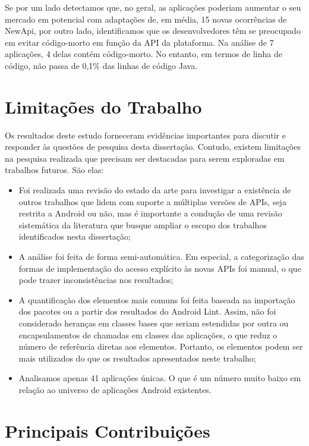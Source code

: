 Se por um lado detectamos que, no geral, as aplicações poderiam aumentar o seu mercado
em potencial com adaptações de, em média, 15 novas ocorrências de NewApi,  por outro
lado, identificamos que os desenvolvedores têm se preocupado em evitar código-morto
em função da API da plataforma. Na análise de 7 aplicações, 4 delas contém código-morto.
No entanto, em termos de linha de código, não passa de 0,1\% das linhas de código Java.

\section{Limitações do Trabalho}\label{sec:limitacoes}

Os resultados deste estudo forneceram evidências importantes para discutir e responder
às questões de pesquisa desta dissertação. Contudo, existem limitações na pesquisa
realizada que precisam ser destacadas para serem exploradas em trabalhos futuros.
São elas:

\begin{itemize}
	\item Foi realizada uma revisão do estado da arte para investigar a existência de
		outros trabalhos que lidem com suporte a múltiplas versões de APIs, seja restrita
		a Android ou não, mas é importante a condução de uma revisão sistemática da
		literatura que busque ampliar o escopo dos trabalhos identificados nesta dissertação;
	\item A análise foi feita de forma semi-automática. Em especial, a categorização
		das formas de implementação do acesso explícito às novas APIs foi manual, o que
		pode trazer inconsistências nos resultados;
	\item A quantificação dos elementos mais comuns foi feita baseada na importação dos
		pacotes ou a partir dos resultados do Android Lint. Assim, não foi considerado
		heranças em classes bases que seriam estendidas por outra ou encapsulamentos de
		chamadas em classes das aplicações, o que reduz o número de referência diretas aos 
		elementos.  Portanto, os elementos podem ser mais utilizados do que os resultados 
		apresentados neste trabalho;
	\item Analisamos apenas 41 aplicações únicas. O que é um número muito baixo em relação
		ao universo de aplicações Android existentes.
\end{itemize}

\section{Principais Contribuições}\label{sec:contribuicoes}

